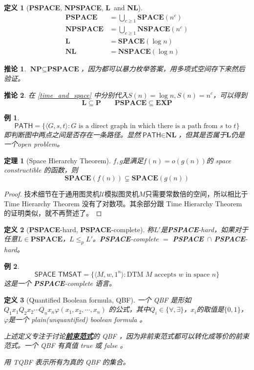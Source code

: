 \documentclass[8pt]{article}
\theoremstyle{compact}
\newtheorem{theorem}{定理}
\newtheorem{definition}{定义}
\newtheorem{corollary}{推论}
\newtheorem{example}{例}
\def\obj#1{\textbf{\uline{#1}}}
\def\le{\leqslant}
\def\ge{\geqslant}
\def\P{\textbf{P}}
\def\NP{\textbf{NP}}
\def\EXP{\textbf{EXP}}
\def\SPACE{\textbf{SPACE}}
\def\NSPACE{\textbf{NSPACE}}
\def\PSPACE{\textbf{PSPACE}}
\def\NPSPACE{\textbf{NPSPACE}}
\def\L{\textbf{L}}
\def\NL{\textbf{NL}}
\begin{document}
\begin{definition}[\PSPACE, \NPSPACE, \L \ and \NL]
	\begin{align*}
		\PSPACE &= \bigcup_{c \ge 1}\SPACE(n^c)\\
		\NPSPACE &= \bigcup_{c \ge 1}\NSPACE(n^c)\\
		\L &= \SPACE(\log n)\\
		\NL &= \NSPACE(\log n)
	\end{align*}
\end{definition}
\begin{corollary}
	$\NP \subseteq \PSPACE$，因为都可以暴力枚举答案，用多项式空间存下来然后验证。
\end{corollary}
\begin{corollary}
	在 \cref{time_and_space} 中分别代入$S(n) = \log n, S(n) = n^c$，可以得到
	$$\L \subseteq \P\qquad \PSPACE \subseteq \EXP$$
\end{corollary}
\begin{example}
	$$\textsf{PATH} = \{ \langle G, s, t\rangle : G \textrm{ is a direct graph in which there is a path from }s \textrm{ to } t\}$$
	即判断图中两点之间是否存在一条路径。显然$\textsf{PATH} \in \NL$，但其是否属于$\L$仍是一个open problem。
\end{example}
\begin{theorem}[Space Hierarchy Theorem]
	$f, g$是满足$f(n) = o(g(n))$的 space constructible 的函数，则
	$$\SPACE(f(n)) \subsetneq \SPACE(g(n))$$
\end{theorem}
\begin{proof}
	技术细节在于通用图灵机$\mathcal U$模拟图灵机$M$只需要常数倍的空间，所以相比于 Time Hierarchy Theorem 没有了对数项。其余部分跟 Time Hierarchy Theorem 的证明类似，就不再赘述了。	
\end{proof}
\begin{definition}[\PSPACE-hard, \PSPACE-complete]
	称$L'$是\PSPACE-hard，如果对于任意$L \in \PSPACE$，$L \le_p L'$。\PSPACE-complete $=$ \PSPACE\ $\cap$ \PSPACE-hard。 
\end{definition}
\begin{example}
	$$\textsf{SPACE TMSAT} = \{ \langle M, w, 1^n \rangle : \textrm{DTM } M \textrm{ accepts } w \textrm{ in space } n \}$$
	这是一个 \PSPACE-complete 语言。
\end{example}
\begin{definition}[Quantified Boolean formula, QBF]
	一个 QBF 是形如 $Q_1x_1Q_2x_2 \cdots Q_nx_n \varphi(x_1, x_2, \cdots, x_n)$ 的公式，其中$Q_i \in \{\forall, \exists\}$，$x_i$的取值是$\{0, 1\}$，$\varphi$是一个 plain(unquantified) boolean formula 。

	上述定义专注于讨论\obj{前束范式}的 QBF ，因为非前束范式都可以转化成等价的前束范式。一个 QBF 有真值 true 或 false 。

	用 \textsf{TQBF} 表示所有为真的 QBF 的集合。
\end{definition}
\end{document}

